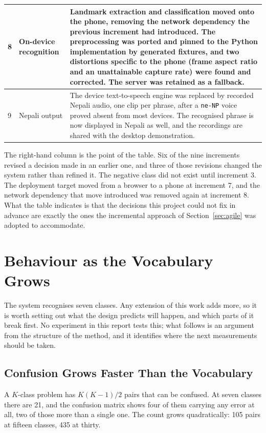 \begin{table}[htbp]
\begin{tabular}{|p{0.9cm}|p{4.2cm}|p{8.1cm}|}
        \hline
        8 & On-device recognition & Landmark extraction and classification moved onto the phone, removing the network dependency the previous increment had introduced. The preprocessing was ported and pinned to the Python implementation by generated fixtures, and two distortions specific to the phone (frame aspect ratio and an unattainable capture rate) were found and corrected. The server was retained as a fallback. \\
        \hline
        9 & Nepali output & The device text-to-speech engine was replaced by recorded Nepali audio, one clip per phrase, after a \texttt{ne-NP} voice proved absent from most devices. The recognised phrase is now displayed in Nepali as well, and the recordings are shared with the desktop demonstration. \\
        \hline
    \end{tabular}
\end{table}

\noindent The right-hand column is the point of the table. Six of the nine increments revised a decision made in an earlier one, and three of those revisions changed the system rather than refined it. The negative class did not exist until increment 3. The deployment target moved from a browser to a phone at increment 7, and the network dependency that move introduced was removed again at increment 8. What the table indicates is that the decisions this project could not fix in advance are exactly the ones the incremental approach of Section~\ref{sec:agile} was adopted to accommodate.

\section{Behaviour as the Vocabulary Grows}
\label{sec:scaling}

The system recognises seven classes. Any extension of this work adds more, so it is worth
setting out what the design predicts will happen, and which parts of it break first. No
experiment in this report tests this; what follows is an argument from the structure of the
method, and it identifies where the next measurements should be taken.

\subsection{Confusion Grows Faster Than the Vocabulary}

A $K$-class problem has $K(K-1)/2$ pairs that can be confused. At seven classes there are
21, and the confusion matrix shows four of them carrying any error at all, two of those
more than a single one. The count grows quadratically: 105 pairs at fifteen classes, 435
at thirty.

